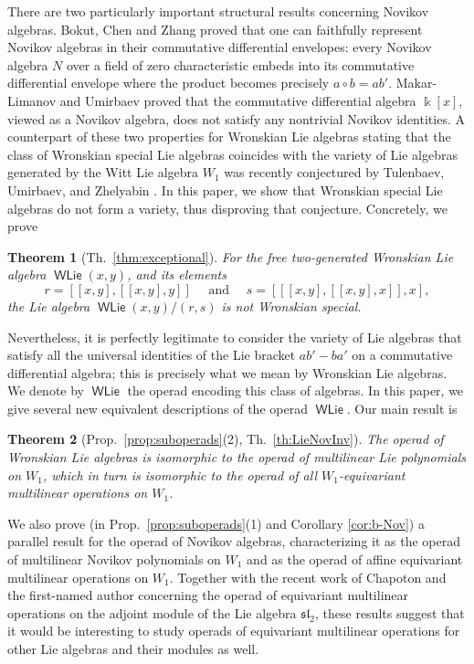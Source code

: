 \documentclass[11pt,reqno]{amsart}
\theoremstyle{plain}
\newtheorem*{itheorem}{Theorem}
\theoremstyle{definition}
\theoremstyle{remark}
\newcommand{\bk}{\Bbbk}
\DeclareMathOperator{\WLie}{\mathsf{WLie}}
\begin{document}
There are two particularly important structural results concerning Novikov algebras. Bokut, Chen and Zhang \cite{MR3590862} proved that one can faithfully represent Novikov algebras in their commutative differential envelopes: every Novikov algebra $N$ over a field of zero characteristic embeds into its commutative differential envelope where the product becomes precisely $a\circ b=ab'$. Makar-Limanov and Umirbaev \cite{MR2884985} proved that the commutative differential algebra $\bk[x]$, viewed as a Novikov algebra, does not satisfy any nontrivial Novikov identities. A counterpart of these two properties for Wronskian Lie algebras stating that the class of Wronskian special Lie algebras coincides with the variety of Lie algebras generated by the Witt Lie algebra $W_1$ was recently conjectured by Tulenbaev, Umirbaev, and Zhelyabin \cite[Conj.~2]{MR4556333}. In this paper, we show that Wronskian special Lie algebras do not form a variety, thus disproving that conjecture. Concretely, we prove

\begin{itheorem}[{Th.~\ref{thm:exceptional}}]
For the free two-generated Wronskian Lie algebra $\WLie(x,y)$, and its elements
 \[
r=[[x,y],[[x,y],y]] \quad \text{ and } \quad  s=[[[x,y],[[x,y],x]],x],   
 \]
the Lie algebra $\WLie(x,y)/(r,s)$ is not Wronskian special. 
\end{itheorem}

Nevertheless, it is perfectly legitimate to consider the variety of Lie algebras that satisfy all the universal identities of the Lie bracket $ab'-ba'$ on a commutative differential algebra; this is precisely what we mean by Wronskian Lie algebras. We denote by $\WLie$ the operad encoding this class of algebras. In this paper, we give several new equivalent descriptions of the operad $\WLie$. Our main result is   

\begin{itheorem}[{Prop.~\ref{prop:suboperads}(2), Th.~\ref{th:LieNovInv}}]
The operad of Wronskian Lie algebras is isomorphic to the operad of multilinear Lie polynomials on $W_1$, which in turn is isomorphic to the operad of all $W_1$-equivariant multilinear operations on $W_1$. 
\end{itheorem}

We also prove (in Prop.~\ref{prop:suboperads}(1) and Corollary \ref{cor:b-Nov}) a parallel result for the operad of Novikov algebras, characterizing it as the operad of multilinear Novikov polynomials on $W_1$ and as the operad of affine equivariant multilinear operations on $W_1$. Together with the recent work of Chapoton and the first-named author \cite{MR5093214} concerning the operad of equivariant multilinear operations on the adjoint module of the Lie algebra $\mathfrak{sl}_2$, these results suggest that it would be interesting to study operads of equivariant multilinear operations for other Lie algebras and their modules as well. 
\end{document}
